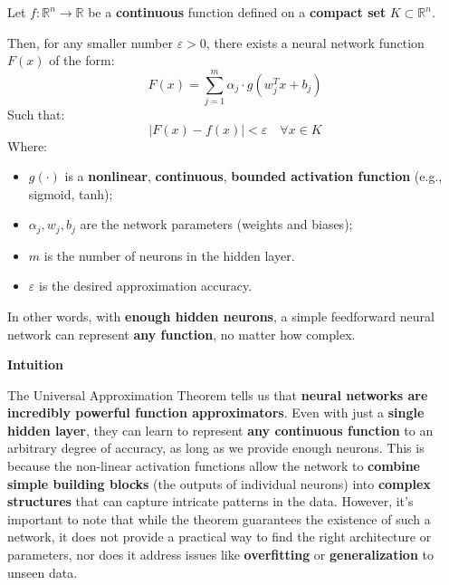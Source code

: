 \begin{theorem}%
    Let $f : \mathbb{R}^{n} \rightarrow \mathbb{R}$ be a \textbf{continuous} function defined on a \textbf{compact set} $K \subset \mathbb{R}^{n}$.

    \highspace
    Then, for any smaller number $\varepsilon > 0$, there exists a neural network function $F(x)$ of the form:
    \begin{equation}
        F(x) = \displaystyle\sum_{j=1}^{m} \alpha_{j} \cdot g\left(w_{j}^{T} x + b_{j}\right)
    \end{equation}
    Such that:
    \begin{equation}
        \left| F(x) - f(x) \right| < \varepsilon \quad \forall x \in K
    \end{equation}
    Where:
    \begin{itemize}
        \item $g\left(\cdot\right)$ is a \textbf{nonlinear}, \textbf{continuous}, \textbf{bounded activation function} (e.g., sigmoid, tanh);
        \item $\alpha_{j}, w_{j}, b_{j}$ are the network parameters (weights and biases);
        \item $m$ is the number of neurons in the hidden layer.
        \item $\varepsilon$ is the desired approximation accuracy.
    \end{itemize}
    In other words, with \textbf{enough hidden neurons}, a simple feedforward neural network can represent \textbf{any function}, no matter how complex.
\end{theorem}

\highspace
\begin{flushleft}
    \textcolor{Green3}{ \textbf{Intuition}}
\end{flushleft}
The Universal Approximation Theorem tells us that \textbf{neural networks are incredibly powerful function approximators}. Even with just a \textbf{single hidden layer}, they can learn to represent \textbf{any continuous function} to an arbitrary degree of accuracy, as long as we provide enough neurons. This is because the non-linear activation functions allow the network to \textbf{combine simple building blocks} (the outputs of individual neurons) into \textbf{complex structures} that can capture intricate patterns in the data. However, it's important to note that while the theorem guarantees the existence of such a network, it does not provide a practical way to find the right architecture or parameters, nor does it address issues like \textbf{overfitting} or \textbf{generalization} to unseen data.

